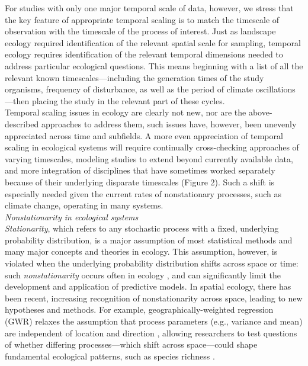 \documentclass[11pt,a4paper,oneside]{article}
\begin{document}
For studies with only one major temporal scale of data, however, we stress that the key feature of appropriate temporal scaling is to match the timescale of observation with the timescale of the process of interest. Just as landscape ecology required identification of the relevant spatial scale for sampling, temporal ecology requires identification of the relevant temporal dimensions needed to address particular ecological questions. This means beginning with a list of all the relevant known timescales---including the generation times of the study organisms, frequency of disturbance, as well as the period of climate oscillations---then placing the study in the relevant part of these cycles. \\

Temporal scaling issues in ecology are clearly not new, nor are the above-described approaches to address them, such issues have, however, been unevenly appreciated across time and subfields. A more even appreciation of temporal scaling in ecological systems will require continually cross-checking approaches of varying timescales, modeling studies to extend beyond currently available data, and more integration of disciplines that have sometimes worked separately because of their underlying disparate timescales (Figure 2). Such a shift is especially needed given the current rates of nonstationary processes, such as climate change, operating in many systems. \\

\noindent \emph{Nonstationarity in ecological systems}\\
\emph{Stationarity}, which refers to any stochastic process with a fixed, underlying probability distribution, is a major assumption of most statistical methods and many major concepts and theories in ecology. This assumption, however, is violated when the underlying probability distribution shifts across space or time: such \emph{nonstationarity} occurs often in ecology \citep{julio2012}, and can significantly limit the development and application of predictive models. In spatial ecology, there has been recent, increasing recognition of nonstationarity across space, leading to new hypotheses and methods. For example, geographically-weighted regression (GWR) relaxes the assumption that process parameters (e.g., variance and mean) are independent of location and direction \citep{Brunsdon:1998nx}, allowing researchers to test questions of whether differing processes---which shift across space---could shape fundamental ecological patterns, such as species richness \citep{davies2011}.\\ %
\end{document}
